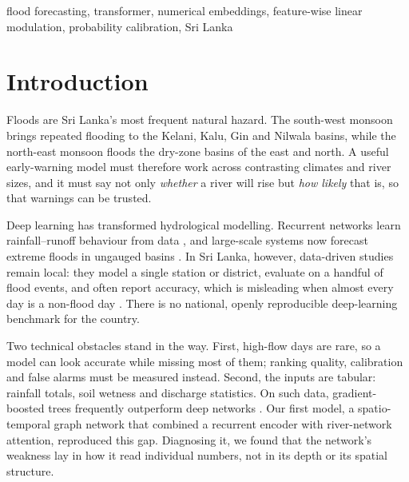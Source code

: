 \documentclass[conference]{IEEEtran}
\begin{document}
\begin{IEEEkeywords}
flood forecasting, transformer, numerical embeddings, feature-wise linear
modulation, probability calibration, Sri Lanka
\end{IEEEkeywords}

\section{Introduction}
Floods are Sri Lanka's most frequent natural hazard. The south-west monsoon
brings repeated flooding to the Kelani, Kalu, Gin and Nilwala basins, while the
north-east monsoon floods the dry-zone basins of the east and north. A useful
early-warning model must therefore work across contrasting climates and river
sizes, and it must say not only \emph{whether} a river will rise but
\emph{how likely} that is, so that warnings can be trusted.

Deep learning has transformed hydrological modelling. Recurrent networks learn
rainfall--runoff behaviour from data \cite{kratzert2018,kratzert2019}, and
large-scale systems now forecast extreme floods in ungauged basins
\cite{nearing2024}. In Sri Lanka, however, data-driven studies remain local:
they model a single station or district, evaluate on a handful of flood events,
and often report accuracy, which is misleading when almost every day is a
non-flood day \cite{saubhagya2025,thilakarathne2017}. There is no national,
openly reproducible deep-learning benchmark for the country.

Two technical obstacles stand in the way. First, high-flow days are rare, so a
model can look accurate while missing most of them; ranking quality,
calibration and false alarms must be measured instead. Second, the inputs are
tabular: rainfall totals, soil wetness and discharge statistics. On such data,
gradient-boosted trees frequently outperform deep networks
\cite{grinsztajn2022,ke2017}. Our first model, a spatio-temporal graph network
that combined a recurrent encoder with river-network attention, reproduced this
gap. Diagnosing it, we found that the network's weakness lay in how it read
individual numbers, not in its depth or its spatial structure.
\end{document}

